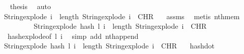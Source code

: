 \begin{isabellebody}
\ \isamarkupfalse%
\ {\isacharquery}{\kern0pt}thesis\ \isamarkupfalse%
\ auto\isanewline
\ \ \ \ \isamarkupfalse%
\isanewline
\ \ \ \ \ \ \isamarkupfalse%
\ {}\isanewline
\ \ \ \ \ \ \isamarkupfalse%
\ \isamarkupfalse%
\ {\isachardoublequoteopen}String{\isachardot}{\kern0pt}explode\ i\ {\isacharbang}{\kern0pt}\ length\ {\isacharparenleft}{\kern0pt}String{\isachardot}{\kern0pt}explode\ i{\isacharprime}{\kern0pt}{\isacharparenright}{\kern0pt}\ {\isasymnoteq}\ CHR\ {\isacharprime}{\kern0pt}{\isacharprime}{\kern0pt}{\isachardot}{\kern0pt}{\isacharprime}{\kern0pt}{\isacharprime}{\kern0pt}{\isachardoublequoteclose}\ \isamarkupfalse%
\ assms{\isacharparenleft}{\kern0pt}{}{\isacharparenright}{\kern0pt}\ \isamarkupfalse%
\ {\isacharparenleft}{\kern0pt}metis\ nth{\isacharunderscore}{\kern0pt}mem{\isacharparenright}{\kern0pt}\isanewline
\ \ \ \ \ \ \isamarkupfalse%
\ \isamarkupfalse%
\ {\isachardoublequoteopen}String{\isachardot}{\kern0pt}explode\ {\isacharparenleft}{\kern0pt}hash\ l\ i{\isacharparenright}{\kern0pt}\ {\isacharbang}{\kern0pt}\ length\ {\isacharparenleft}{\kern0pt}String{\isachardot}{\kern0pt}explode\ i{\isacharprime}{\kern0pt}{\isacharparenright}{\kern0pt}\ {\isasymnoteq}\ CHR\ {\isacharprime}{\kern0pt}{\isacharprime}{\kern0pt}{\isachardot}{\kern0pt}{\isacharprime}{\kern0pt}{\isacharprime}{\kern0pt}{\isachardoublequoteclose}\ \isamarkupfalse%
\ {}\ hash{\isacharunderscore}{\kern0pt}explode{\isacharbrackleft}{\kern0pt}of\ l\ i{\isacharbrackright}{\kern0pt}\ \isamarkupfalse%
\ {\isacharparenleft}{\kern0pt}simp\ add{\isacharcolon}{\kern0pt}\ nth{\isacharunderscore}{\kern0pt}append{\isacharparenright}{\kern0pt}\isanewline
\ \ \ \ \ \ \isamarkupfalse%
\ \isamarkupfalse%
\ {\isachardoublequoteopen}String{\isachardot}{\kern0pt}explode\ {\isacharparenleft}{\kern0pt}hash\ l{\isacharprime}{\kern0pt}\ i{\isacharprime}{\kern0pt}{\isacharparenright}{\kern0pt}\ {\isacharbang}{\kern0pt}\ length\ {\isacharparenleft}{\kern0pt}String{\isachardot}{\kern0pt}explode\ i{\isacharprime}{\kern0pt}{\isacharparenright}{\kern0pt}\ {\isacharequal}{\kern0pt}\ CHR\ {\isacharprime}{\kern0pt}{\isacharprime}{\kern0pt}{\isachardot}{\kern0pt}{\isacharprime}{\kern0pt}{\isacharprime}{\kern0pt}{\isachardoublequoteclose}\ \isamarkupfalse%
\ hash{\isacharunderscore}{\kern0pt}dot\ \isamarkupfalse%

\end{isabellebody}
